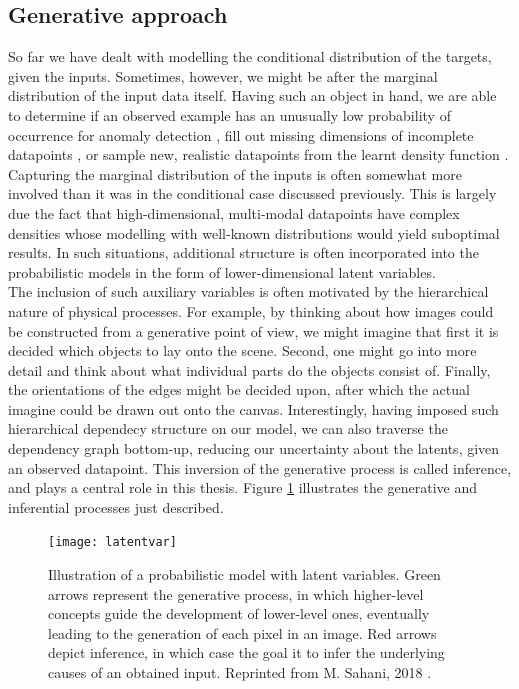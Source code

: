 \documentclass{report}
\begin{document}
\subsection{Generative approach}

\noindent So far we have dealt with modelling the conditional distribution of the targets, given the inputs. Sometimes, however, we might be after the marginal distribution of the input data itself. Having such an object in hand, we are able to determine if an observed example has an unusually low probability of occurrence for anomaly detection \cite{vae-anomaly}, fill out missing dimensions of incomplete datapoints \cite{missing-data}, or sample new, realistic datapoints from the learnt density function \cite{vaegan}.  \\

\noindent Capturing the marginal distribution of the inputs is often somewhat more involved than it was in the conditional case discussed previously. This is largely due the fact that high-dimensional, multi-modal datapoints have complex densities whose modelling with well-known distributions would yield suboptimal results. In such situations, additional structure is often incorporated into the probabilistic models in the form of lower-dimensional latent variables. \\

\noindent The inclusion of such auxiliary variables is often motivated by the hierarchical nature of physical processes. For example, by thinking about how images could be constructed from a generative point of view, we might imagine that first it is decided which objects to lay onto the scene. Second, one might go into more detail and think about what individual parts do the objects consist of. Finally, the orientations of the edges might be decided upon, after which the actual imagine could be drawn out onto the canvas. Interestingly, having imposed such hierarchical dependecy structure on our model, we can also traverse the dependency graph bottom-up, reducing our uncertainty about the latents, given an observed datapoint. This inversion of the generative process is called inference, and plays a central role in this thesis. Figure \ref{fig:latent-vars} illustrates the generative and inferential processes just described. \\

\begin{figure}
\begin{center}
\texttt{[image: latentvar]}
\caption{Illustration of a probabilistic model with latent variables. Green arrows represent the generative process, in which higher-level concepts guide the development of lower-level ones, eventually leading to the generation of each pixel in an image. Red arrows depict inference, in which case the goal it to infer the underlying causes of an obtained input. Reprinted from M. Sahani, 2018 \cite{gatsby-slide}.}
\label{fig:latent-vars}
\end{center}
\end{figure}
\end{document}
